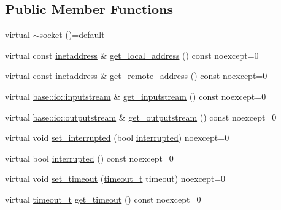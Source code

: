 \subsection*{Public Member Functions}
\begin{DoxyCompactItemize}
\item 
virtual \hyperlink{structdevfix_1_1net_1_1socket_ad9d4d9643894e213faefd4e37938f1fe}{$\sim$socket} ()=default
\item 
virtual const \hyperlink{structdevfix_1_1net_1_1inetaddress}{inetaddress} \& \hyperlink{structdevfix_1_1net_1_1socket_a570b728ca81a3d47ca7733ff21063318}{get\+\_\+local\+\_\+address} () const noexcept=0
\item 
virtual const \hyperlink{structdevfix_1_1net_1_1inetaddress}{inetaddress} \& \hyperlink{structdevfix_1_1net_1_1socket_afb69dcc8da66eb15a927d031f50a4ba2}{get\+\_\+remote\+\_\+address} () const noexcept=0
\item 
virtual \hyperlink{structdevfix_1_1base_1_1io_1_1inputstream}{base\+::io\+::inputstream} \& \hyperlink{structdevfix_1_1net_1_1socket_a3a00115497ccb83e8497a7e33be06b03}{get\+\_\+inputstream} () const noexcept=0
\item 
virtual \hyperlink{structdevfix_1_1base_1_1io_1_1outputstream}{base\+::io\+::outputstream} \& \hyperlink{structdevfix_1_1net_1_1socket_ac0320fa786f14778a3a1e2796d9dce57}{get\+\_\+outputstream} () const noexcept=0
\item 
virtual void \hyperlink{structdevfix_1_1net_1_1socket_a3fa8d7dcd44e7740b29ad6674005eb5d}{set\+\_\+interrupted} (bool \hyperlink{structdevfix_1_1net_1_1socket_a7cfe151f1124d46fb19fad0c374c9352}{interrupted}) noexcept=0
\item 
virtual bool \hyperlink{structdevfix_1_1net_1_1socket_a7cfe151f1124d46fb19fad0c374c9352}{interrupted} () const noexcept=0
\item 
virtual void \hyperlink{structdevfix_1_1net_1_1socket_ae1cf3b2c4f5d39225d6585c387f967d5}{set\+\_\+timeout} (\hyperlink{structdevfix_1_1net_1_1socket_a80a3bf4cb7292bae31ea9c6575539c68}{timeout\+\_\+t} timeout) noexcept=0
\item 
virtual \hyperlink{structdevfix_1_1net_1_1socket_a80a3bf4cb7292bae31ea9c6575539c68}{timeout\+\_\+t} \hyperlink{structdevfix_1_1net_1_1socket_afac86b6ad30a758ce590e7a144764967}{get\+\_\+timeout} () const noexcept=0
\end{DoxyCompactItemize}
